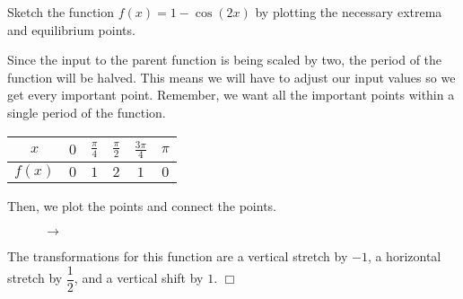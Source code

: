 \documentclass[lang=en,11pt]{elegantbook}
\begin{document}
\begin{example}
Sketch the function $f(x)=1-\cos(2x)$ by plotting the necessary extrema and equilibrium points.
\end{example}
\begin{solution}
Since the input to the parent function is being scaled by two, the period of the function will be halved. This means we will have to adjust our input values so we get every important point. Remember, we want all the important points within a single period of the function.
\begin{table}[!h]
    \centering
    \begin{tabular}{|c||c|c|c|c|c|}
        \toprule
        $x$ & $0$ & $\frac{\pi}{4}$ & $\frac{\pi}{2}$ & $\frac{3\pi}{4}$ & $\pi$ \\
        \midrule
        $f(x)$ & $0$ & $1$ & $2$ & $1$ & $0$ \\
        \bottomrule
    \end{tabular}
\end{table}

Then, we plot the points and connect the points.
\begin{figure}[!h]
    \centering
     $\to$ 
\end{figure}

The transformations for this function are a vertical stretch by $-1$, a horizontal stretch by $\dfrac{1}{2}$, and a vertical shift by $1$. $\Box$
\end{solution}
\end{document}
